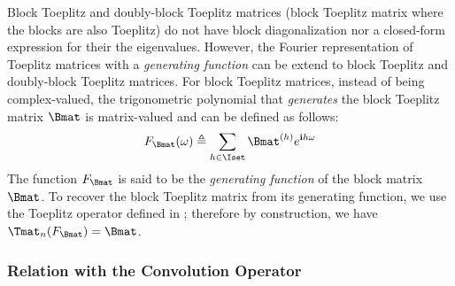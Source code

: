 \noindent
Block Toeplitz and doubly-block Toeplitz matrices (block Toeplitz matrix where the blocks are also Toeplitz) do not have block diagonalization nor a closed-form expression for their the eigenvalues.
However, the Fourier representation of Toeplitz matrices with a \emph{generating function} can be extend to block Toeplitz and doubly-block Toeplitz matrices.
For block Toeplitz matrices, instead of being complex-valued, the trigonometric polynomial that \emph{generates} the block Toeplitz matrix $\Bmat$ is matrix-valued and can be defined as follows:
\begin{equation}
  F_{\Bmat}(\omega) \triangleq \sum_{h \in \Iset} \Bmat^{(h)} e^{\ci h \omega}
\end{equation}
The function $F_{\Bmat}$ is said to be the \emph{generating function} of the block matrix $\Bmat$.
To recover the block Toeplitz matrix from its generating function, we use the Toeplitz operator defined in ; therefore by construction, we have $\Tmat_n(F_\Bmat) = \Bmat$.







\vspace{1.50cm}
\pagebreak

\subsubsection{Relation with the Convolution Operator}
\label{subsubsection:ch2-relation_with_the_convolution_operator}

